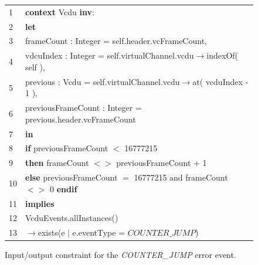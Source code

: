 \begin{figure}[t!]
\scriptsize
\begin{tabular}{p{0.1cm}p{8cm}}
1&\textbf{context} Vcdu \textbf{inv}:\\
2&\textbf{let}\\
3&\hspace{0.3cm}frameCount : Integer = self.header.vcFrameCount, \\
4&\hspace{0.3cm}vdcuIndex : Integer = self.virtualChannel.vcdu$\rightarrow$indexOf( self ), \\
5&\hspace{0.3cm}previous : Vcdu = self.virtualChannel.vcdu$\rightarrow$at( vcduIndex - 1 ),\\
6&\hspace{0.3cm}previousFrameCount : Integer = previous.header.vcFrameCount\\
7&\textbf{in} \\
8&\hspace{0.3cm}\textbf{if} previousFrameCount $<$ 16777215 \\
9&\hspace{0.6cm}\textbf{then} frameCount $<>$ previousFrameCount + 1 \\
10&\hspace{0.3cm}\textbf{else} previousFrameCount $=$ 16777215 and frameCount $<>$ 0 \textbf{endif}\\
11&\textbf{implies} \\
12&\hspace{0.3cm}VcduEvents.allInstances()\\
13&\hspace{1cm}$\rightarrow$exists(e $|$ e.eventType = $COUNTER\_JUMP$) \\
\end{tabular}
\caption{Input/output constraint for the \emph{COUNTER\_JUMP} error event.}
\label{fig:costraint:firstHeader}
\end{figure}


 

